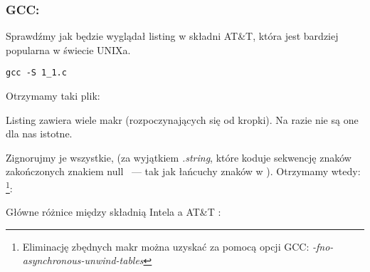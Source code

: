 \subsubsection{GCC: \ATTSyntax}
\label{ATT_syntax}

Sprawdźmy jak będzie wyglądał listing w składni AT\&T, która jest bardziej popularna w świecie UNIXa.

\begin{lstlisting}[caption=Kompilujemy za pomocą GCC 4.7.3]
gcc -S 1_1.c
\end{lstlisting}

Otrzymamy taki plik:



Listing zawiera wiele makr (rozpoczynających się od kropki). Na razie nie są one dla nas istotne.

Zignorujmy je wszystkie, (za wyjątkiem \emph{.string}, które koduje sekwencję znaków zakończonych znakiem null ~--- tak jak łańcuchy znaków w \Cpp). Otrzymamy wtedy:
\footnote{Eliminację zbędnych makr można uzyskać za pomocą opcji GCC: \emph{-fno-asynchronous-unwind-tables}}:



\myindex{\ATTSyntax}
\myindex{\IntelSyntax}
Główne różnice między składnią Intela a AT\&T :

